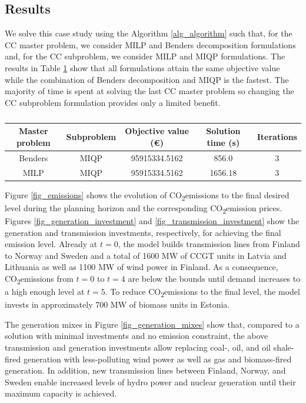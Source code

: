 \documentclass[final]{IEEEtran}
\newcommand{\COtwo}{CO\textsubscript{2}\;}
\begin{document}
\subsection{Results}

We solve this case study using the Algorithm \ref{alg_algorithm} such that, for the CC master problem, we consider MILP and Benders decomposition formulations and, for the CC subproblem, we consider MILP and MIQP formulations. The results in Table \ref{table_results} show that all formulations attain the same objective value while the combination of Benders decomposition and MIQP is the fastest. The majority of time is spent at solving the last CC master problem so changing the CC subproblem formulation provides only a limited benefit.

\begin{table}[htpb]
\centering
\begin{tabular}{c c| c c c} \hline
Master problem 			& Subproblem 		& Objective value (€) 	& Solution time (s) & Iterations \\ \hline
Benders					& MIQP 				& 95915334.5162 		& 856.0				& 3				 \\
MILP					& MIQP 				& 95915334.5162 		& 1656.18			& 3				 \\
\end{tabular}
\caption{}
\label{table_results}
\end{table}

Figure \ref{fig_emissions} shows the evolution of \COtwo emissions to the final desired level during the planning horizon and the corresponding \COtwo emission prices. Figures \ref{fig_generation_investment} and \ref{fig_transmission_investment} show the generation and transmission investments, respectively, for achieving the final emission level. Already at $t = 0$, the model builds transmission lines from Finland to Norway and Sweden and a total of 1600 MW of CCGT units in Latvia and Lithuania as well as 1100 MW of wind power in Finland. As a consequence, \COtwo emissions from $t = 0$ to $t = 4$ are below the bounds until demand increases to a high enough level at $t = 5$. To reduce \COtwo emissions to the final level, the model invests in approximately 700 MW of biomass units in Estonia.

The generation mixes in Figure \ref{fig_generation_mixes} show that, compared to a solution with minimal investments and no emission constraint, the above transmission and generation investments allow replacing coal-, oil, and oil shale-fired generation with less-polluting wind power as well as gas and biomass-fired generation. In addition, new transmission lines between Finland, Norway, and Sweden enable increased levels of hydro power and nuclear generation until their maximum capacity is achieved.
\end{document}
